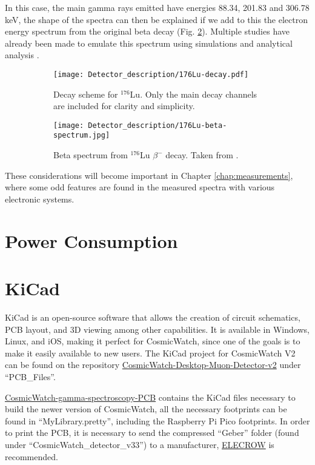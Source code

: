 In this case, the main gamma rays emitted have energies 88.34, 201.83 and 306.78 \unit{\kilo\eV}, the shape of the spectra can then be explained if we add to this the electron energy spectrum from the original beta decay (Fig. \ref{sfig:176Lu_beta_spectra}). Multiple studies have already been made to emulate this spectrum using simulations and analytical analysis \cite{LYSO_background,LYSO_background_Geant4}.

\begin{figure}[H]
  \centering
  \begin{subfigure}[t]{0.45\textwidth}
    \texttt{[image: Detector\_description/176Lu-decay.pdf]}
    \caption{\label{sfig:176Lu}Decay scheme for $^{176}$Lu. Only the main decay channels are included for clarity and simplicity.}
  \end{subfigure}
  \begin{subfigure}[t]{0.5\textwidth}
    \texttt{[image: Detector\_description/176Lu-beta-spectrum.jpg]}
    \caption{\label{sfig:176Lu_beta_spectra}Beta spectrum from $^{176}$Lu $\beta^-$ decay. Taken from \cite{IAEA}.}
  \end{subfigure}
  \caption{\label{fig:LYSO_decay}}
\end{figure}

These considerations will become important in Chapter \ref{chap:measurements}, where some odd features are found in the measured spectra with various electronic systems.

\section{Power Consumption}

\section{KiCad}

KiCad is an open-source software that allows the creation of circuit schematics, PCB layout, and 3D viewing among other capabilities. It is available in Windows, Linux, and iOS, making it perfect for CosmicWatch, since one of the goals is to make it easily available to new users. The KiCad project for CosmicWatch V2 can be found on the repository \href{https://github.com/spenceraxani/CosmicWatch-Desktop-Muon-Detector-v2}{CosmicWatch-Desktop-Muon-Detector-v2} under ``PCB\_Files''.

\href{https://github.com/anvargasl/CosmicWatch-gamma-spectroscopy-PCB}{CosmicWatch-gamma-spectroscopy-PCB} contains the KiCad files necessary to build the newer version of CosmicWatch, all the necessary footprints can be found in ``MyLibrary.pretty'', including the Raspberry Pi Pico footprints. In order to print the PCB, it is necessary to send the compressed ``Geber'' folder (found under ``CosmicWatch\_detector\_v33'') to a manufacturer, \href{https://www.elecrow.com/pcb-manufacturing.html}{ELECROW} is recommended.


